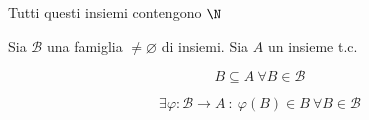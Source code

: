 \documentclass[../appunti.tex]{subfiles}
\begin{document}
\begin{defn}
Tutti questi insiemi contengono $ \N $ 
\end{defn}

\begin{defn}
Sia $\mathcal{B}$ una famiglia $ \neq \varnothing$ di insiemi. Sia $A$ un insieme t.c.

\begin{equation}
	B \subseteq A \ \forall B \in \mathcal{B}
\end{equation}
\bda

\begin{equation}
	\exists \varphi: \mathcal{B} \to A\ :\ \varphi(B) \in B \ \forall B \in \mathcal{B}
\end{equation}

\end{defn}
\end{document}
